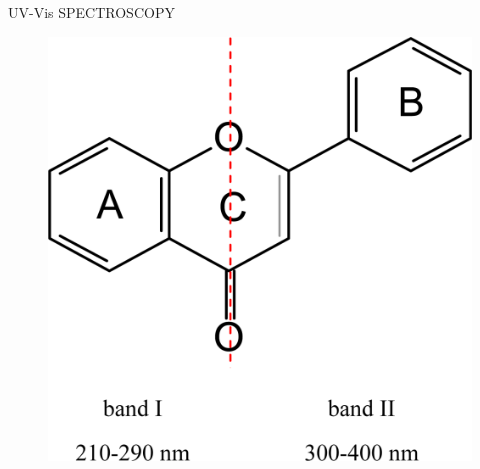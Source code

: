 \documentclass[11pt]{beamer}
\begin{document}
\begin{frame}{UV-Vis SPECTROSCOPY}
	\begin{figure}
		\centering
		\includegraphics[scale=0.2]{ijms-11-00595f10}
	\end{figure}
\end{frame}
\end{document}
